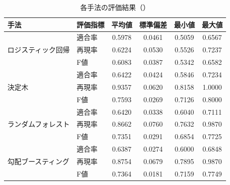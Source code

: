 \begin{table}[tb]
    \caption{各手法の評価結果（\testthird）}
    \label{tab:all_single_metrics_prospect_task2}
    \centering
    \begin{tabular}{llcccc}
        \hline
        手法 & 評価指標 & 平均値 & 標準偏差 & 最小値 & 最大値 \\\hline \hline
        \multirow{3}{*}{ロジスティック回帰} & 適合率& 0.5978 & 0.0461 & 0.5059 & 0.6567 \\
         & 再現率& 0.6224 & 0.0530 & 0.5526 & 0.7237 \\
         & F値& 0.6083 & 0.0387 & 0.5342 & 0.6582 \\\hline
        \multirow{3}{*}{決定木} & 適合率& 0.6422 & 0.0424 & 0.5846 & 0.7234 \\
         & 再現率& 0.9357 & 0.0620 & 0.8158 & 1.0000 \\
         & F値& 0.7593 & 0.0269 & 0.7126 & 0.8000 \\\hline
        \multirow{3}{*}{ランダムフォレスト} & 適合率& 0.6420 & 0.0338 & 0.6040 & 0.7111 \\
         & 再現率& 0.8662 & 0.0760 & 0.7632 & 0.9870 \\
         & F値& 0.7351 & 0.0291 & 0.6854 & 0.7725 \\\hline
        \multirow{3}{*}{勾配ブースティング} & 適合率& 0.6387 & 0.0274 & 0.6000 & 0.6848 \\
         & 再現率& 0.8754 & 0.0679 & 0.7895 & 0.9870 \\
         & F値& 0.7364 & 0.0181 & 0.7159 & 0.7749 \\\hline
    \end{tabular}
\end{table}
